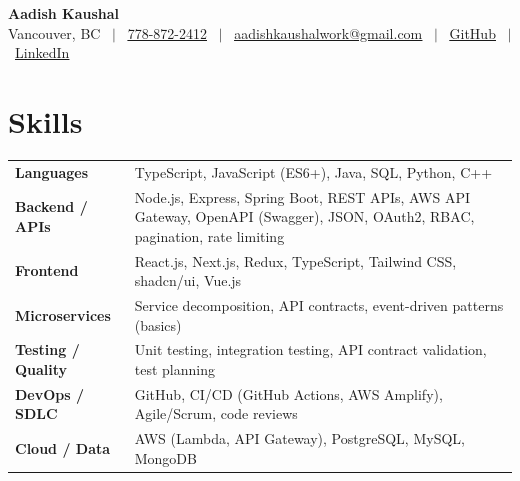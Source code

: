 \documentclass[11pt]{article}
\begin{document}
\begin{center}
  \textbf{\Huge Aadish Kaushal} \\ \vspace{2pt}
  \small Vancouver, BC \, $|$ \,
  \href{tel:7788722412}{\underline{778-872-2412}} \, $|$ \,
  \href{mailto:aadishkaushalwork@gmail.com}{\underline{aadishkaushalwork@gmail.com}} \, $|$ \,
  \href{https://github.com/Aadish001}{\underline{GitHub}} \, $|$ \,
  \href{https://linkedin.com/in/aadish-kaushal-36474a31a/}{\underline{LinkedIn}}
\end{center}
\vspace{-6pt}

\section*{Skills}
\vspace{-2pt}
\begin{tabularx}{\textwidth}{@{}p{} X@{}}
\textbf{Languages} &
TypeScript, JavaScript (ES6+), Java, SQL, Python, C++ \\

\textbf{Backend / APIs} &
Node.js, Express, Spring Boot, REST APIs, AWS API Gateway, OpenAPI (Swagger), JSON, OAuth2, RBAC, pagination, rate limiting \\

\textbf{Frontend} &
React.js, Next.js, Redux, TypeScript, Tailwind CSS, shadcn/ui, Vue.js \\

\textbf{Microservices} &
Service decomposition, API contracts, event-driven patterns (basics) \\

\textbf{Testing / Quality} &
Unit testing, integration testing, API contract validation, test planning \\

\textbf{DevOps / SDLC} &
GitHub, CI/CD (GitHub Actions, AWS Amplify), Agile/Scrum, code reviews \\

\textbf{Cloud / Data} &
AWS (Lambda, API Gateway), PostgreSQL, MySQL, MongoDB \\
\end{tabularx}

\end{document}
